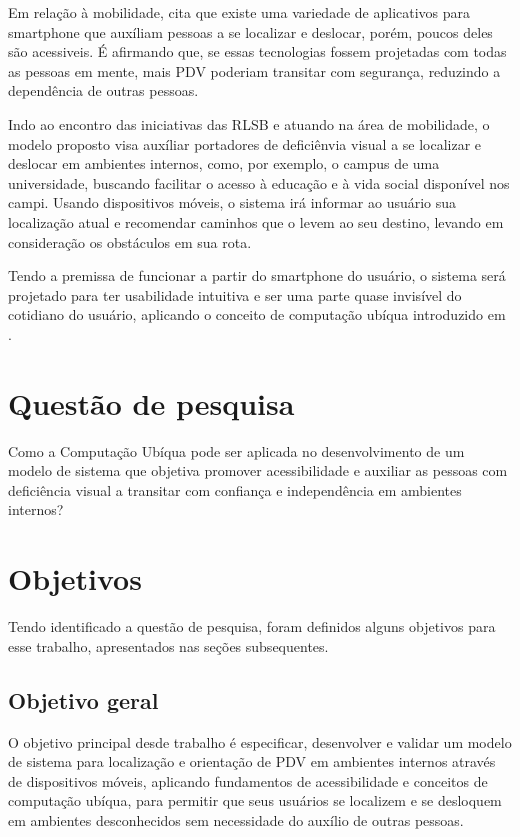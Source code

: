 \documentclass[english,brazilian]{UNISINOSmonografia}
\begin{document}
Em relação à mobilidade,  cita que existe uma variedade de aplicativos para smartphone que auxíliam pessoas a se localizar e deslocar, porém, poucos deles são acessiveis. É afirmando que, se essas tecnologias fossem projetadas com todas as pessoas em mente, mais PDV poderiam transitar com segurança, reduzindo a dependência de outras pessoas. 

Indo ao encontro das iniciativas das RLSB e atuando na área de mobilidade, o modelo proposto visa auxíliar portadores de deficiênvia visual a se localizar e deslocar em ambientes internos, como, por exemplo, o campus de uma universidade, buscando facilitar o acesso à educação e à vida social disponível nos campi. Usando dispositivos móveis, o sistema irá informar ao usuário sua localização atual e recomendar caminhos que o levem ao seu destino, levando em consideração os obstáculos em sua rota.

Tendo a premissa de funcionar a partir do smartphone do usuário, o sistema será projetado para ter usabilidade intuitiva e ser uma parte quase invisível do cotidiano do usuário, aplicando o conceito de computação ubíqua introduzido em .	

	\section{Questão de pesquisa}
	Como a Computação Ubíqua pode ser aplicada no desenvolvimento de um modelo de sistema que objetiva promover acessibilidade e auxiliar as pessoas com deficiência visual a transitar com confiança e independência em ambientes internos?

	\section{Objetivos}
	Tendo identificado a questão de pesquisa, foram definidos alguns objetivos para esse trabalho, apresentados nas seções subsequentes.
	
		\subsection{Objetivo geral}
		O objetivo principal desde trabalho é especificar, desenvolver e validar um modelo de sistema para localização e orientação de PDV em ambientes internos através de dispositivos móveis, aplicando fundamentos de acessibilidade e conceitos de computação ubíqua, para permitir que seus usuários se localizem e se desloquem em ambientes desconhecidos sem necessidade do auxílio de outras pessoas.
\end{document}
